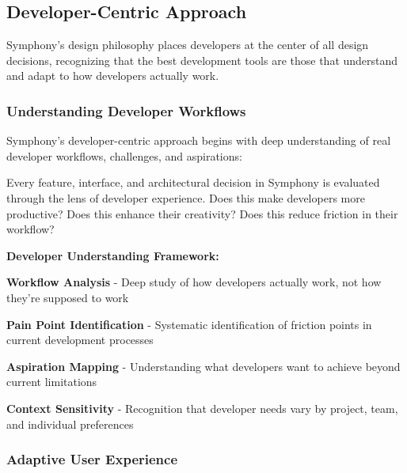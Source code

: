 \subsection{Developer-Centric Approach}
\label{subsec:developer-centric-approach}

Symphony's design philosophy places developers at the center of all design decisions, recognizing that the best development tools are those that understand and adapt to how developers actually work.

\subsubsection{Understanding Developer Workflows}

Symphony's developer-centric approach begins with deep understanding of real developer workflows, challenges, and aspirations:

\begin{infobox}[title=Developer-First Design]
Every feature, interface, and architectural decision in Symphony is evaluated through the lens of developer experience. Does this make developers more productive? Does this enhance their creativity? Does this reduce friction in their workflow?
\end{infobox}

\textbf{Developer Understanding Framework:}

\begin{expandedlist}
    \item \textbf{Workflow Analysis} - Deep study of how developers actually work, not how they're supposed to work
    
    \item \textbf{Pain Point Identification} - Systematic identification of friction points in current development processes
    
    \item \textbf{Aspiration Mapping} - Understanding what developers want to achieve beyond current limitations
    
    \item \textbf{Context Sensitivity} - Recognition that developer needs vary by project, team, and individual preferences
\end{expandedlist}

\subsubsection{Adaptive User Experience}


